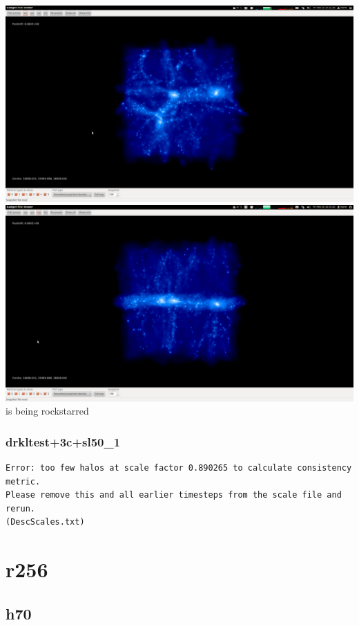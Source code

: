 \documentclass[a4paper,11pt,fleqn,oneside]{book}
\begin{document}
\includegraphics[scale=0.12]{drdx_h100_r128_2/1.png} 
\includegraphics[scale=0.12]{drdx_h100_r128_2/2.png} 
is being rockstarred 

\newpage
\subsubsection{drkltest+3c+sl50\_1}
\begin{verbatim}
Error: too few halos at scale factor 0.890265 to calculate consistency metric.
Please remove this and all earlier timesteps from the scale file and rerun.
(DescScales.txt)
\end{verbatim}




\newpage
\section{r256} %

\newpage
\subsection{h70} %
 
\end{document}
